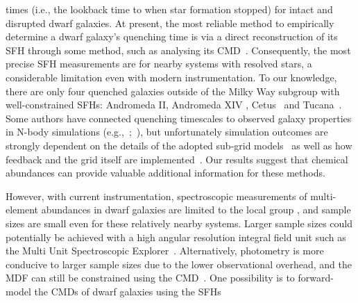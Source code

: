 \documentclass[foo.tex]{subfiles}
\begin{document}
times (i.e., the lookback time to when star formation stopped) for intact and 
disrupted dwarf galaxies.
At present, the most reliable method to empirically determine a dwarf galaxy's
quenching time is via a direct reconstruction of its SFH through some method,
such as analysing its CMD~\citep[e.g.,][]{Dolphin2002, Weisz2015}.
Consequently, the most precise SFH measurements are for nearby systems with
resolved stars, a considerable limitation even with modern instrumentation.
To our knowledge, there are only four quenched galaxies outside of the Milky
Way subgroup with well-constrained SFHs: Andromeda II, Andromeda XIV
\citep{Weisz2014a}, Cetus~\citep{Monelli2010a} and Tucana~\citep{Monelli2010b}.
Some authors have connected quenching timescales to observed galaxy properties
in N-body simulations (e.g.,~\citealp*{Rocha2012};~\citealp{Slater2013,
Slater2014, Phillips2014, Phillips2015, Wheeler2014}), but unfortunately
simulation outcomes are strongly dependent on the details of the adopted
sub-grid models~\citep[e.g.,][]{Li2020} as well as how feedback and the grid
itself are implemented~\citep{Hu2022}.
Our results suggest that chemical abundances can provide valuable additional
information for these methods.
\par
However, with current instrumentation, spectroscopic measurements of
multi-element abundances in dwarf galaxies are limited to the local group
\citep[e.g.,][]{Kirby2011, Kirby2020}, and sample sizes are small even for
these relatively nearby systems.
Larger sample sizes could potentially be achieved with a high
angular resolution integral field unit such as the Multi Unit Spectroscopic
Explorer~\citep[MUSE;][]{Bacon2014}.
Alternatively, photometry is more conducive to larger sample sizes due to the
lower observational overhead, and the MDF can still be constrained using the
CMD~\citep[e.g.,][]{Lianou2011}.
One possibility is to forward-model the CMDs of dwarf galaxies using the SFHs
\end{document}
